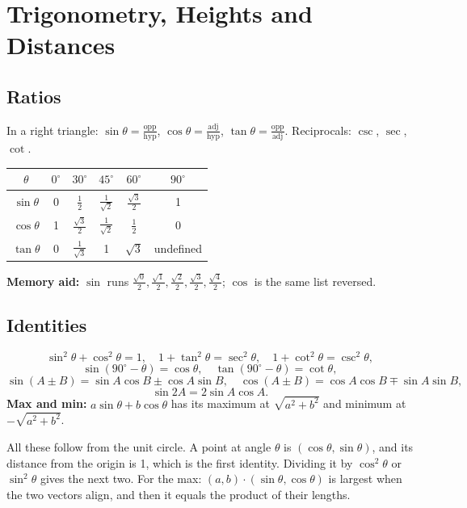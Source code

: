 \documentclass[11pt,a4paper,openany]{report}
\begin{document}
\chapter{Trigonometry, Heights and Distances}\label{ch:trig}

\section{Ratios}
In a right triangle: $\sin\theta=\frac{\text{opp}}{\text{hyp}}$, $\cos\theta=\frac{\text{adj}}{\text{hyp}}$, $\tan\theta=\frac{\text{opp}}{\text{adj}}$. Reciprocals: $\csc$, $\sec$, $\cot$.
\begin{center}
\begin{tabular}{c|ccccc}
\toprule
$\theta$ & $0^\circ$ & $30^\circ$ & $45^\circ$ & $60^\circ$ & $90^\circ$\\\midrule
$\sin\theta$ & 0 & $\frac12$ & $\frac1{\sqrt2}$ & $\frac{\sqrt3}2$ & 1\\[3pt]
$\cos\theta$ & 1 & $\frac{\sqrt3}2$ & $\frac1{\sqrt2}$ & $\frac12$ & 0\\[3pt]
$\tan\theta$ & 0 & $\frac1{\sqrt3}$ & 1 & $\sqrt3$ & undefined\\
\bottomrule
\end{tabular}
\end{center}
\textbf{Memory aid:} $\sin$ runs $\frac{\sqrt0}2,\frac{\sqrt1}2,\frac{\sqrt2}2,\frac{\sqrt3}2,\frac{\sqrt4}2$; $\cos$ is the same list reversed.

\section{Identities}
\[\sin^2\theta+\cos^2\theta=1,\quad1+\tan^2\theta=\sec^2\theta,\quad1+\cot^2\theta=\csc^2\theta,\]
\[\sin(90^\circ-\theta)=\cos\theta,\quad\tan(90^\circ-\theta)=\cot\theta,\]
\[\sin(A\pm B)=\sin A\cos B\pm\cos A\sin B,\quad\cos(A\pm B)=\cos A\cos B\mp\sin A\sin B,\]
\[\sin2A=2\sin A\cos A.\]
\textbf{Max and min:} $a\sin\theta+b\cos\theta$ has its maximum at $\sqrt{a^2+b^2}$ and minimum at $-\sqrt{a^2+b^2}$.
\begin{why}
All these follow from the unit circle. A point at angle $\theta$ is $(\cos\theta,\sin\theta)$, and its distance from the origin is 1, which is the first identity. Dividing it by $\cos^2\theta$ or $\sin^2\theta$ gives the next two. For the max: $(a,b)\cdot(\sin\theta,\cos\theta)$ is largest when the two vectors align, and then it equals the product of their lengths.
\end{why}
\end{document}
